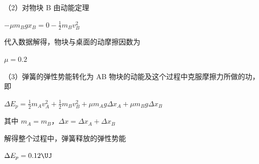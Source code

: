 \documentclass[\gkver]{gaokaozhenti}
\begin{document}
\begin{enumerate}[resume=tiku]
{（2）对物块 B 由动能定理

$-\mu m_{B}gx_{B} = 0 - \frac{1}{2}m_{B}v_{B}^{2}$

代入数据解得，物块与桌面的动摩擦因数为

$\mu = 0.2$

（3）弹簧的弹性势能转化为 AB 物块的动能及这个过程中克服摩擦力所做的功，即

$\Delta E_{p} = \frac{1}{2}m_{A}v_{A}^{2} + \frac{1}{2}m_{B}v_{B}^{2} + \mu m_{A}g\Delta x_{A} + \mu m_{B}g\Delta x_{B}$

其中 $m_{A} = m_{B}$，$\Delta x = \Delta x_{A} + \Delta x_{B}$

解得整个过程中，弹簧释放的弹性势能

$\Delta E_{p} = 0.12 \UJ$
}

\end{enumerate}
\end{document}
